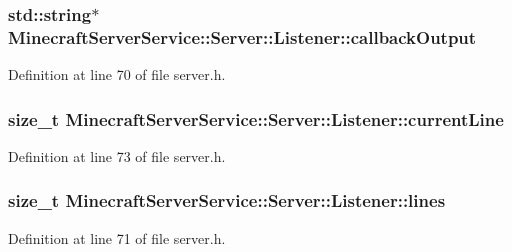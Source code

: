\subsubsection[{\texorpdfstring{callback\+Output}{callbackOutput}}]{\setlength{\rightskip}{0pt plus 5cm}std\+::string$\ast$ Minecraft\+Server\+Service\+::\+Server\+::\+Listener\+::callback\+Output}\hypertarget{struct_minecraft_server_service_1_1_server_1_1_listener_afe51cb4015caab08814ce3bd0a3ec82a}{}\label{struct_minecraft_server_service_1_1_server_1_1_listener_afe51cb4015caab08814ce3bd0a3ec82a}


Definition at line 70 of file server.\+h.

\subsubsection[{\texorpdfstring{current\+Line}{currentLine}}]{\setlength{\rightskip}{0pt plus 5cm}size\+\_\+t Minecraft\+Server\+Service\+::\+Server\+::\+Listener\+::current\+Line}\hypertarget{struct_minecraft_server_service_1_1_server_1_1_listener_a9a92bb07a6417a09094c7495f5fa6c84}{}\label{struct_minecraft_server_service_1_1_server_1_1_listener_a9a92bb07a6417a09094c7495f5fa6c84}


Definition at line 73 of file server.\+h.

\subsubsection[{\texorpdfstring{lines}{lines}}]{\setlength{\rightskip}{0pt plus 5cm}size\+\_\+t Minecraft\+Server\+Service\+::\+Server\+::\+Listener\+::lines}\hypertarget{struct_minecraft_server_service_1_1_server_1_1_listener_a5a853e93216533fd712c340a1a205bd6}{}\label{struct_minecraft_server_service_1_1_server_1_1_listener_a5a853e93216533fd712c340a1a205bd6}


Definition at line 71 of file server.\+h.

